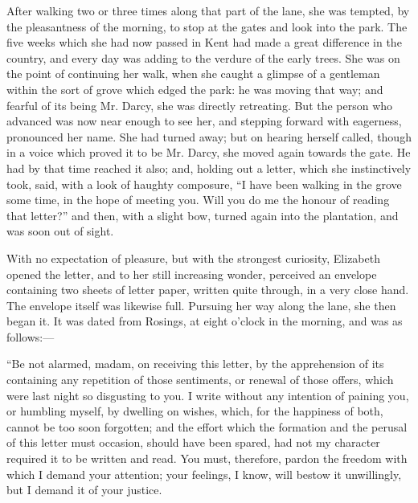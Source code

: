 After walking two or three times along that part of the lane, she was tempted, by the pleasantness of the morning, to stop at the gates and look into the park. The five weeks which she had now passed in Kent had made a great difference in the country, and every day was adding to the verdure of the early trees. She was on the point of continuing her walk, when she caught a glimpse of a gentleman within the sort of grove which edged the park: he was moving that way; and fearful of its being Mr. Darcy, she was directly retreating. But the person who advanced was now near enough to see her, and stepping forward with eagerness, pronounced her name. She had turned away; but on hearing herself called, though in a voice which proved it to be Mr. Darcy, she moved again towards the gate. He had by that time reached it also; and, holding out a letter, which she instinctively took, said, with a look of haughty composure, ``I have been walking in the grove some time, in the hope of meeting you. Will you do me the honour of reading that letter?'' and then, with a slight bow, turned again into the plantation, and was soon out of sight.

With no expectation of pleasure, but with the strongest curiosity, Elizabeth opened the letter, and to her still increasing wonder, perceived an envelope containing two sheets of letter paper, written quite through, in a very close hand. The envelope itself was likewise full. Pursuing her way along the lane, she then began it. It was dated from Rosings, at eight o'clock in the morning, and was as follows:---

``Be not alarmed, madam, on receiving this letter, by the apprehension of its containing any repetition of those sentiments, or renewal of those offers, which were last night so disgusting to you. I write without any intention of paining you, or humbling myself, by dwelling on wishes, which, for the happiness of both, cannot be too soon forgotten; and the effort which the formation and the perusal of this letter must occasion, should have been spared, had not my character required it to be written and read. You must, therefore, pardon the freedom with which I demand your attention; your feelings, I know, will bestow it unwillingly, but I demand it of your justice.

